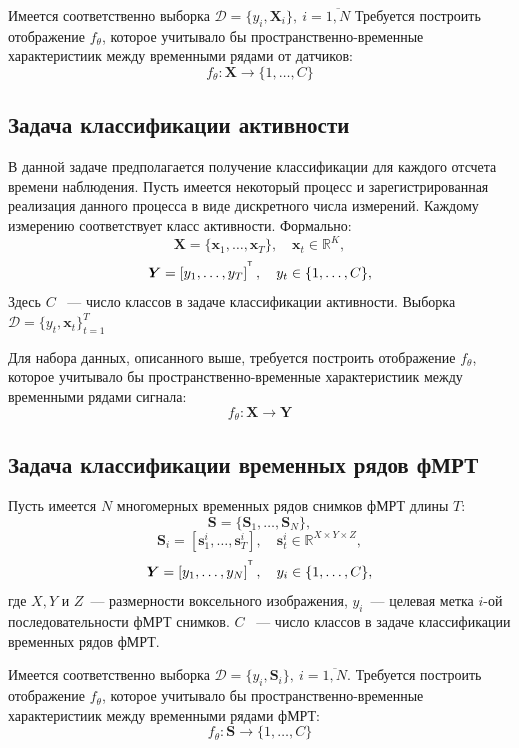 \documentclass[a4paper, 12pt]{extarticle}
\begin{document}
Имеется соответственно выборка $\mathcal{D} = \{y_i, \bm{X}_i\},~  i = \overline{1,N}$
Требуется построить отображение $f_\theta$, которое учитывало 
бы пространственно-временные характеристиик между временными рядами от датчиков:
$$f_\theta: \bm{X} \rightarrow \{1,\dots, C\}$$ 
\subsection{Задача классификации активности}
В данной задаче предполагается получение классификации для каждого отсчета 
времени наблюдения.
Пусть имеется некоторый процесс и зарегистрированная реализация данного 
процесса в виде дискретного числа измерений. Каждому измерению соответствует
класс активности. Формально:
$$\bm{X} = \{\bm{x}_1,\dots, \bm{x}_{T}\}, \quad \bm{x}_t \in \mathbb{R}^K,$$
$$\bm{Y} = \left[y_1, \dots, y_{T}\right]^{^{\mathsf{T}}},\quad y_t \in \{1,\dots, C\},$$
Здесь $C$ ~--- число классов в задаче классификации активности. 
Выборка $\mathcal{D} = \{y_t, \bm{x}_t\}_{t=1}^T$

Для набора данных, описанного выше, требуется построить отображение $f_\theta$, которое учитывало 
бы пространственно-временные характеристиик между временными рядами сигнала:
$$f_\theta: \bm{X} \rightarrow \bm{Y}$$ 

\subsection{Задача классификации временных рядов фМРТ}
Пусть имеется $N$ многомерных временных рядов снимков фМРТ длины $T$:
\begin{equation*} 
	\bm{S} = \{\bm{S}_1,\dots, \bm{S}_{N}\},
\end{equation*}
\begin{equation*}
	\bm{S}_i = [\bm{s}_{1}^i, \ldots, \bm{s}_{T}^i], \quad
	\bm{s}_{t}^i \in \mathbb{R}^{X \times Y \times Z},
\end{equation*}
$$\bm{Y} = \left[y_1, \dots, y_{N}\right]^{^{\mathsf{T}}},\quad y_i \in \{1,\dots, C\},$$
где $X, Y$ и $Z$~--- размерности воксельного изображения, 
$y_i$~--- целевая метка $i$-ой последовательности фМРТ снимков. 
$C$ ~--- число классов в задаче классификации временных рядов фМРТ. 

Имеется соответственно выборка $\mathcal{D} = \{y_i, \bm{S}_i\},~ i = \overline{1,N}$.
Требуется построить отображение $f_\theta$, которое учитывало 
бы пространственно-временные характеристиик между временными рядами фМРТ:
$$f_\theta: \bm{S} \rightarrow \{1,\dots, C\}$$  
\end{document}
